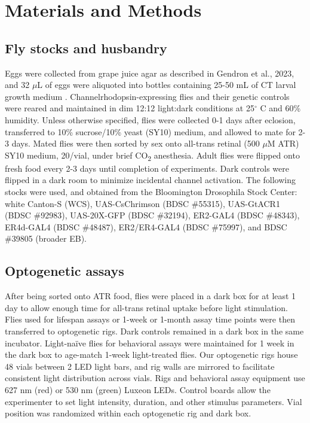 \section*{Materials and Methods}

\subsection*{Fly stocks and husbandry}

Eggs were collected from grape juice agar as described in Gendron et al., 2023, and 32 $\mu$L of eggs were aliquoted into bottles containing 25-50 mL of CT larval growth medium \citep{skorupa2008}. 
Channelrhodopsin-expressing flies and their genetic controls were reared and maintained in dim 12:12 light:dark conditions at 25$^{\circ}$ C and 60\% humidity.
Unless otherwise specified, flies were collected 0-1 days after eclosion, transferred to 10\% sucrose/10\% yeast (SY10) medium, and allowed to mate for 2-3 days.
Mated flies were then sorted by sex onto all-trans retinal (500 $\mu$M ATR) SY10 medium, 20/vial, under brief CO\textsubscript{2} anesthesia. 
Adult flies were flipped onto fresh food every 2-3 days until completion of experiments.
Dark controls were flipped in a dark room to minimize incidental channel activation. 
The following stocks were used, and obtained from the Bloomington Drosophila Stock Center: white Canton-S (WCS), UAS-CsChrimson (BDSC \#55315), UAS-GtACR1 (BDSC \#92983), UAS-20X-GFP (BDSC \#32194), ER2-GAL4 (BDSC \#48343), ER4d-GAL4 (BDSC \#48487), ER2/ER4-GAL4 (BDSC \#75997), and BDSC \#39805 (broader EB).

\subsection*{Optogenetic assays}

After being sorted onto ATR food, flies were placed in a dark box for at least 1 day to allow enough time for all-trans retinal uptake before light stimulation. 
Flies used for lifespan assays or 1-week or 1-month assay time points were then transferred to optogenetic rigs.
Dark controls remained in a dark box in the same incubator. 
Light-naïve flies for behavioral assays were maintained for 1 week in the dark box to age-match 1-week light-treated flies.
Our optogenetic rigs house 48 vials between 2 LED light bars, and rig walls are mirrored to facilitate consistent light distribution across vials. 
Rigs and behavioral assay equipment use 627 nm (red) or 530 nm (green) Luxeon LEDs. 
Control boards allow the experimenter to set light intensity, duration, and other stimulus parameters. 
Vial position was randomized within each optogenetic rig and dark box.

